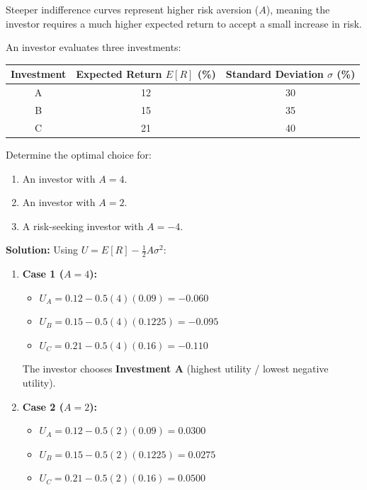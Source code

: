 Steeper indifference curves represent higher risk aversion ($A$), meaning the investor requires a much higher expected return to accept a small increase in risk.
\begin{tcolorbox}[
	colback=gray!5!white,
	colframe=black!15!white,
	boxrule=0.5pt,
	arc=3pt,
	title=\textbf{Knowledge Check: Utility calculations},
	coltitle=black,
	colbacktitle=black!5!white,
	before skip=6pt,
	after skip=6pt,
	breakable
]
An investor evaluates three investments:
\begin{center}
\begin{tabular}{c  c  c}
	\toprule
	\textbf{Investment} & \textbf{Expected Return $E[R]$ (\%)} & \textbf{Standard Deviation $\sigma$ (\%)} \\
	\midrule
	A & 12 & 30 \\
	B & 15 & 35 \\
	C & 21 & 40 \\
	\bottomrule
\end{tabular}
\end{center}
Determine the optimal choice for:
\begin{enumerate}
	\item An investor with $A = 4$.
	\item An investor with $A = 2$.
	\item A risk-seeking investor with $A = -4$.
\end{enumerate}
\textbf{Solution:}
Using $U = E[R] - \frac{1}{2} A \sigma^2$:
\begin{enumerate}
	\item \textbf{Case 1 ($A = 4$):}
	      \begin{itemize}
		      \item $U_A = 0.12 - 0.5(4)(0.09) = -0.060$
		      \item $U_B = 0.15 - 0.5(4)(0.1225) = -0.095$
		      \item $U_C = 0.21 - 0.5(4)(0.16) = -0.110$
	      \end{itemize}
	      The investor chooses \textbf{Investment A} (highest utility / lowest negative utility).
	\item \textbf{Case 2 ($A = 2$):}
	      \begin{itemize}
		      \item $U_A = 0.12 - 0.5(2)(0.09) = 0.0300$
		      \item $U_B = 0.15 - 0.5(2)(0.1225) = 0.0275$
		      \item $U_C = 0.21 - 0.5(2)(0.16) = 0.0500$
	      \end{itemize}

\end{enumerate}
\end{tcolorbox}
